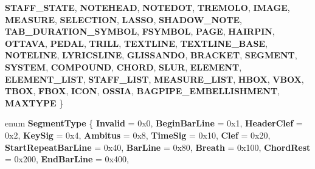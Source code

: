 \begin{DoxyCompactItemize}
\newline
{\bfseries S\+T\+A\+F\+F\+\_\+\+S\+T\+A\+TE}, 
{\bfseries N\+O\+T\+E\+H\+E\+AD}, 
{\bfseries N\+O\+T\+E\+D\+OT}, 
{\bfseries T\+R\+E\+M\+O\+LO}, 
\newline
{\bfseries I\+M\+A\+GE}, 
{\bfseries M\+E\+A\+S\+U\+RE}, 
{\bfseries S\+E\+L\+E\+C\+T\+I\+ON}, 
{\bfseries L\+A\+S\+SO}, 
\newline
{\bfseries S\+H\+A\+D\+O\+W\+\_\+\+N\+O\+TE}, 
{\bfseries T\+A\+B\+\_\+\+D\+U\+R\+A\+T\+I\+O\+N\+\_\+\+S\+Y\+M\+B\+OL}, 
{\bfseries F\+S\+Y\+M\+B\+OL}, 
{\bfseries P\+A\+GE}, 
\newline
{\bfseries H\+A\+I\+R\+P\+IN}, 
{\bfseries O\+T\+T\+A\+VA}, 
{\bfseries P\+E\+D\+AL}, 
{\bfseries T\+R\+I\+LL}, 
\newline
{\bfseries T\+E\+X\+T\+L\+I\+NE}, 
{\bfseries T\+E\+X\+T\+L\+I\+N\+E\+\_\+\+B\+A\+SE}, 
{\bfseries N\+O\+T\+E\+L\+I\+NE}, 
{\bfseries L\+Y\+R\+I\+C\+S\+L\+I\+NE}, 
\newline
{\bfseries G\+L\+I\+S\+S\+A\+N\+DO}, 
{\bfseries B\+R\+A\+C\+K\+ET}, 
{\bfseries S\+E\+G\+M\+E\+NT}, 
{\bfseries S\+Y\+S\+T\+EM}, 
\newline
{\bfseries C\+O\+M\+P\+O\+U\+ND}, 
{\bfseries C\+H\+O\+RD}, 
{\bfseries S\+L\+UR}, 
{\bfseries E\+L\+E\+M\+E\+NT}, 
\newline
{\bfseries E\+L\+E\+M\+E\+N\+T\+\_\+\+L\+I\+ST}, 
{\bfseries S\+T\+A\+F\+F\+\_\+\+L\+I\+ST}, 
{\bfseries M\+E\+A\+S\+U\+R\+E\+\_\+\+L\+I\+ST}, 
{\bfseries H\+B\+OX}, 
\newline
{\bfseries V\+B\+OX}, 
{\bfseries T\+B\+OX}, 
{\bfseries F\+B\+OX}, 
{\bfseries I\+C\+ON}, 
\newline
{\bfseries O\+S\+S\+IA}, 
{\bfseries B\+A\+G\+P\+I\+P\+E\+\_\+\+E\+M\+B\+E\+L\+L\+I\+S\+H\+M\+E\+NT}, 
{\bfseries M\+A\+X\+T\+Y\+PE}
 \}
\item 
\mbox{\label{namespace_ms_a24593d5bc01ac95fdbec3d354d258894}} 
enum {\bfseries Segment\+Type} \{ \newline
{\bfseries Invalid} = 0x0, 
{\bfseries Begin\+Bar\+Line} = 0x1, 
{\bfseries Header\+Clef} = 0x2, 
{\bfseries Key\+Sig} = 0x4, 
\newline
{\bfseries Ambitus} = 0x8, 
{\bfseries Time\+Sig} = 0x10, 
{\bfseries Clef} = 0x20, 
{\bfseries Start\+Repeat\+Bar\+Line} = 0x40, 
\newline
{\bfseries Bar\+Line} = 0x80, 
{\bfseries Breath} = 0x100, 
{\bfseries Chord\+Rest} = 0x200, 
{\bfseries End\+Bar\+Line} = 0x400, 
\newline

\end{DoxyCompactItemize}
